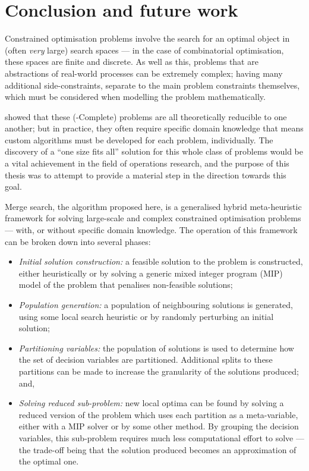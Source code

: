 \documentclass[journal]{IEEEtran}
\begin{document}
\section{Conclusion and future work}

Constrained optimisation problems involve the search for an optimal object in (often \emph{very} large) search spaces --- in the case of combinatorial optimisation, these spaces are finite and discrete. As well as this, problems that are abstractions of real-world processes can be extremely complex; having many additional side-constraints, separate to the main problem constraints themselves, which must be considered when modelling the problem mathematically.

\cite{np:karp} showed that these (\NP-Complete) problems are all theoretically reducible to one another; but in practice, they often require specific domain knowledge that means custom algorithms must be developed for each problem, individually. The discovery of a ``one size fits all'' solution for this whole class of problems would be a vital achievement in the field of operations research, and the purpose of this thesis was to attempt to provide a material step in the direction towards this goal.

Merge search, the algorithm proposed here, is a generalised hybrid meta-heuristic framework for solving large-scale and complex constrained optimisation problems --- with, or without specific domain knowledge. The operation of this framework can be broken down into several phases:
\begin{itemize}
\item \emph{Initial solution construction:} a feasible solution to the problem is constructed, either heuristically or by solving a generic mixed integer program (MIP) model of the problem that penalises non-feasible solutions;
\item \emph{Population generation:} a population of neighbouring solutions is generated, using some local search heuristic or by randomly perturbing an initial solution;
\item \emph{Partitioning variables:} the population of solutions is used to determine how the set of decision variables are partitioned. Additional splits to these partitions can be made to increase the granularity of the solutions produced; and,
\item \emph{Solving reduced sub-problem:} new local optima can be found by solving a reduced version of the problem which uses each partition as a meta-variable, either with a MIP solver or by some other method. By grouping the decision variables, this sub-problem requires much less computational effort to solve --- the trade-off being that the solution produced becomes an approximation of the optimal one.
\end{itemize}
\end{document}
